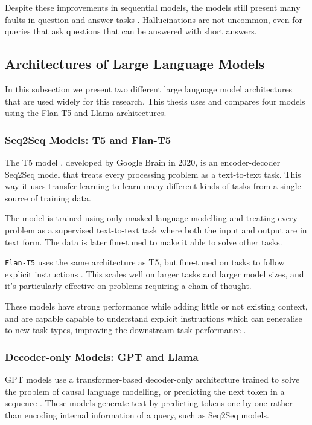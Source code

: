 Despite these improvements in sequential models, the models still present many faults in question-and-answer tasks \citep{how_can_we_know}.
Hallucinations are not uncommon, even for queries that ask questions that can be answered with short answers.

\subsection{Architectures of Large Language Models}
\label{llm_architectures}

In this subsection we present two different large language model architectures that are used widely for this research.
This thesis uses and compares four models using the Flan-T5 and Llama architectures.

\subsubsection{Seq2Seq Models: T5 and Flan-T5}

The T5 model \citep{t5}, developed by Google Brain in 2020, is an encoder-decoder Seq2Seq model that treats every processing problem as a text-to-text task.
This way it uses transfer learning to learn many different kinds of tasks from a single source of training data.

The model is trained using only masked language modelling and treating every problem as a supervised text-to-text task where both the input and output are in text form.
The data is later fine-tuned to make it able to solve other tasks.

\texttt{Flan-T5} uses the same architecture as T5, but fine-tuned on tasks to follow explicit instructions \citep{flant5}.
This scales well on larger tasks and larger model sizes, and it's particularly effective on problems requiring a chain-of-thought.

These models have strong performance while adding little or not existing context, and are capable capable to understand explicit instructions which can generalise to new task types, improving the downstream task performance \citep{flan_performance}.

\subsubsection{Decoder-only Models: GPT and Llama}

GPT models use a transformer-based decoder-only architecture trained to solve the problem of causal language modelling, or predicting the next token in a sequence \citep{gpt,gpt2,gpt3}.
These models generate text by predicting tokens one-by-one rather than encoding internal information of a query, such as Seq2Seq models.

